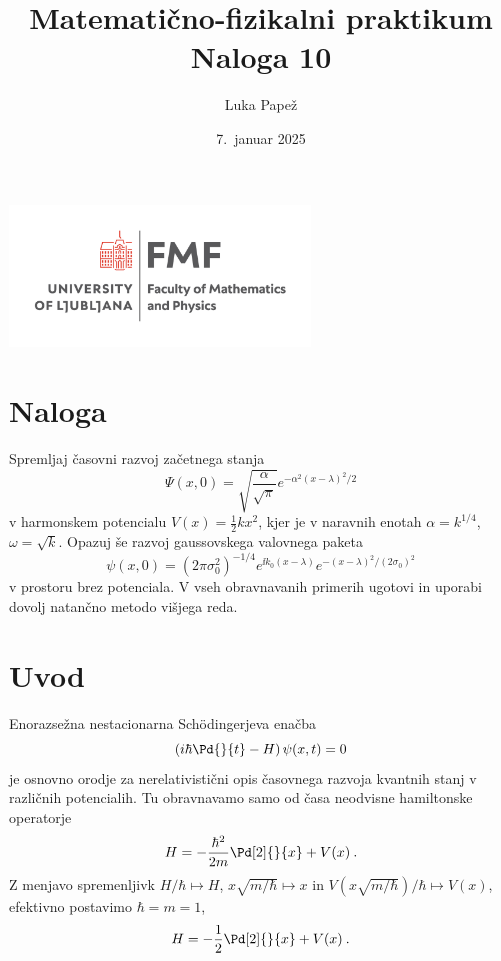 \documentclass{article}
\begin{document}
\title{Matematično-fizikalni praktikum \\[3mm] \large Naloga 10}
\author{Luka Papež}
\date{7.\ januar 2025}

\begin{center}
    \includegraphics[width=8cm]{logo-fmf.png}
\end{center}

{
    \let\newpage\relax
    \maketitle
}

\maketitle
\newpage
\section{Naloga}
Spremljaj časovni razvoj začetnega stanja
\begin{equation*}
  \Psi(x,0)=\sqrt{\frac{\alpha}{\sqrt{\pi}}} e^{-\alpha^2 (x-\lambda)^2/2}
\end{equation*}
v harmonskem potencialu $V(x)=\frac12 kx^2$, kjer je v naravnih enotah $\alpha=k^{1/4}$, $\omega=\sqrt{k}$. 
Opazuj še razvoj gaussovskega valovnega paketa
\begin{equation*}
  \psi(x,0)=(2\pi \sigma_0^2)^{-1/4} e^{\ii k_0(x-\lambda)}e^{-(x-\lambda)^2/(2\sigma_0)^2}
\end{equation*}
v prostoru brez potenciala. 
V vseh obravnavanih primerih ugotovi in uporabi dovolj natančno metodo višjega reda.

\section{Uvod}
Enorazsežna nestacionarna Sch\"odingerjeva enačba
\begin{equation*}
  \left(i\hbar\Pd{}{t}-H\right)\psi(x,t)=0
\end{equation*}
je osnovno orodje za nerelativistični opis časovnega razvoja kvantnih stanj v različnih potencialih. Tu obravnavamo samo od časa neodvisne hamiltonske operatorje
\begin{equation*}
  H=-\frac{\hbar^2}{2m}\Pd[2]{}{x}+V(x)\>.
\end{equation*}
Z menjavo spremenljivk $H/\hbar\mapsto H$, $x\sqrt{m/\hbar}\mapsto x$ in $V(x\sqrt{m/\hbar})/\hbar\mapsto V(x)$, efektivno postavimo $\hbar=m=1$,
\begin{equation}
  H=-\frac12\Pd[2]{}{x}+V(x)\>.
  \label{eq:hamilton}
\end{equation}
\end{document}
